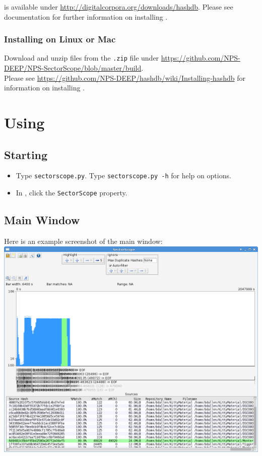 \documentclass[11pt,fleqn]{article} %
\begin{document}
\hdb is available under \url{http://digitalcorpora.org/downloads/hashdb}. Please see \hdb documentation for further information on installing \hdb.\\

\subsubsection{Installing on Linux or Mac}
Download and unzip \sscope files from the \verb+.zip+ file under \url{https://github.com/NPS-DEEP/NPS-SectorScope/blob/master/build}.\\ Please see \url{https://github.com/NPS-DEEP/hashdb/wiki/Installing-hashdb} for information on installing \hdb.\\

\section{Using \sscope}
\subsection{Starting \sscope}
\begin{itemize}
\item Type \verb+sectorscope.py+. Type \verb+sectorscope.py -h+ for help on options.
\item In \aut, click the \verb+SectorScope+ property.
\end{itemize}

\subsection{Main Window}
Here is an example screenshot of the \sscope main window:\\
\includegraphics[scale=.4]{screenshots/main_window}\\
\end{document}
